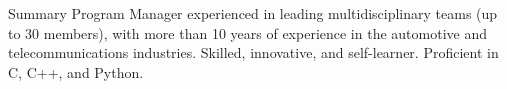
\summary
    {Summary}
    {Program Manager experienced in leading multidisciplinary teams (up to 30 members), with more than 10 years of experience in the automotive and telecommunications industries. Skilled, innovative, and self-learner. Proficient in C, C++, and Python.}

